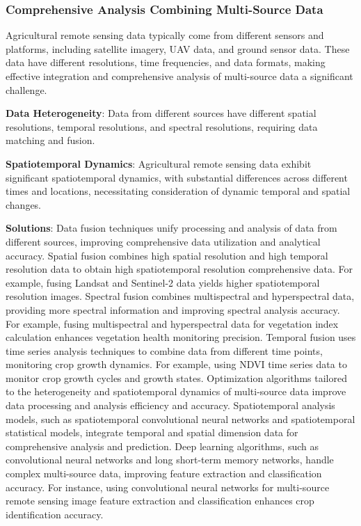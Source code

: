 \subsubsection{Comprehensive Analysis Combining Multi-Source Data}

Agricultural remote sensing data typically come from different sensors and platforms, including satellite imagery, UAV data, and ground sensor data. These data have different resolutions, time frequencies, and data formats, making effective integration and comprehensive analysis of multi-source data a significant challenge.

\textbf{Data Heterogeneity}:
Data from different sources have different spatial resolutions, temporal resolutions, and spectral resolutions, requiring data matching and fusion.

\textbf{Spatiotemporal Dynamics}:
Agricultural remote sensing data exhibit significant spatiotemporal dynamics, with substantial differences across different times and locations, necessitating consideration of dynamic temporal and spatial changes.

\textbf{Solutions}:
Data fusion techniques unify processing and analysis of data from different sources, improving comprehensive data utilization and analytical accuracy. Spatial fusion combines high spatial resolution and high temporal resolution data to obtain high spatiotemporal resolution comprehensive data. For example, fusing Landsat and Sentinel-2 data yields higher spatiotemporal resolution images. Spectral fusion combines multispectral and hyperspectral data, providing more spectral information and improving spectral analysis accuracy. For example, fusing multispectral and hyperspectral data for vegetation index calculation enhances vegetation health monitoring precision. Temporal fusion uses time series analysis techniques to combine data from different time points, monitoring crop growth dynamics. For example, using NDVI time series data to monitor crop growth cycles and growth states. Optimization algorithms tailored to the heterogeneity and spatiotemporal dynamics of multi-source data improve data processing and analysis efficiency and accuracy. Spatiotemporal analysis models, such as spatiotemporal convolutional neural networks and spatiotemporal statistical models, integrate temporal and spatial dimension data for comprehensive analysis and prediction. Deep learning algorithms, such as convolutional neural networks and long short-term memory networks, handle complex multi-source data, improving feature extraction and classification accuracy. For instance, using convolutional neural networks for multi-source remote sensing image feature extraction and classification enhances crop identification accuracy.
